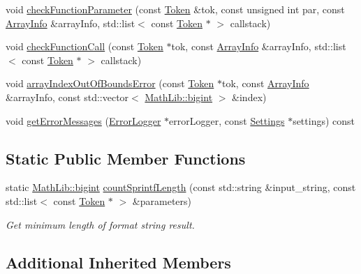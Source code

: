 \begin{DoxyCompactItemize}
void \hyperlink{class_check_buffer_overrun_a349c85e9194cf7661bd2b3f1eed515f6}{check\-Function\-Parameter} (const \hyperlink{class_token}{Token} \&tok, const unsigned int par, const \hyperlink{class_check_buffer_overrun_1_1_array_info}{Array\-Info} \&array\-Info, std\-::list$<$ const \hyperlink{class_token}{Token} $\ast$ $>$ callstack)
\item 
void \hyperlink{class_check_buffer_overrun_ae6b4206b902bb519a791eda0e95a6ae1}{check\-Function\-Call} (const \hyperlink{class_token}{Token} $\ast$tok, const \hyperlink{class_check_buffer_overrun_1_1_array_info}{Array\-Info} \&array\-Info, std\-::list$<$ const \hyperlink{class_token}{Token} $\ast$ $>$ callstack)
\item 
void \hyperlink{class_check_buffer_overrun_ad30a16a5a56ac0f3fe137117afc70d21}{array\-Index\-Out\-Of\-Bounds\-Error} (const \hyperlink{class_token}{Token} $\ast$tok, const \hyperlink{class_check_buffer_overrun_1_1_array_info}{Array\-Info} \&array\-Info, const std\-::vector$<$ \hyperlink{class_math_lib_aea370b3be964c5704b6244d757fcac99}{Math\-Lib\-::bigint} $>$ \&index)
\item 
void \hyperlink{class_check_buffer_overrun_a21d46e65e2b2e030bc5b049c8f61d277}{get\-Error\-Messages} (\hyperlink{class_error_logger}{Error\-Logger} $\ast$error\-Logger, const \hyperlink{class_settings}{Settings} $\ast$settings) const 
\end{DoxyCompactItemize}
\subsection*{Static Public Member Functions}
\begin{DoxyCompactItemize}
\item 
static \hyperlink{class_math_lib_aea370b3be964c5704b6244d757fcac99}{Math\-Lib\-::bigint} \hyperlink{class_check_buffer_overrun_a9e6e2bcffc541c9b54cff59301d8b3b2}{count\-Sprintf\-Length} (const std\-::string \&input\-\_\-string, const std\-::list$<$ const \hyperlink{class_token}{Token} $\ast$ $>$ \&parameters)
\begin{DoxyCompactList}\small\item\em Get minimum length of format string result. \end{DoxyCompactList}\end{DoxyCompactItemize}
\subsection*{Additional Inherited Members}


